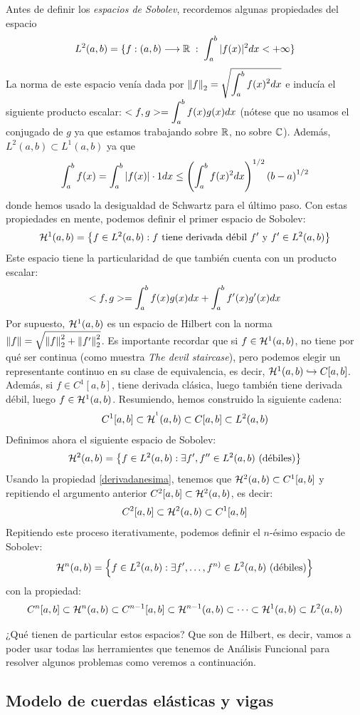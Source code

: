 Antes de definir los \textit{espacios de Sobolev}, recordemos algunas propiedades del espacio 
\[L^2(a,b)=\displaystyle\{f : (a,b) \longrightarrow \mathbb{R}\;:\; \displaystyle\int_{ a }^{ b } |f(x)|^2dx<+\infty\displaystyle\}\]
La norma de este espacio venía dada por $\left\lVert f\right\rVert_2=\sqrt{\displaystyle\int_{ a }^{ b } f(x)^2dx}$ e inducía el siguiente producto escalar: $<f,g>=\displaystyle\int_{ a }^{ b } f(x)g(x)dx$ (nótese que no usamos el conjugado de $g$ ya que estamos trabajando sobre $\mathbb{R}$, no sobre $\mathbb{C}$). Además, $L^2(a,b)\subset L^1(a,b)$ ya que 
\[
\displaystyle\int_{ a }^{ b } f(x)=\displaystyle\int_{ a }^{ b } |f(x)|\cdot 1dx\leq \left(\displaystyle\int_{ a }^{ b } f(x)^2dx\right)^{1/2}\left(b-a\right)^{1/2}
\]
donde hemos usado la desigualdad de Schwartz para el último paso. Con estas propiedades en mente, podemos definir el primer espacio de Sobolev:
\[
\mathcal{H}^{ 1 }(a,b)=\left\{ f\in L^{ 2 }(a,b): f \text{ tiene derivada débil }f' \text{ y } f'\in L^{ 2 }(a,b) \right\}
\]
Este espacio tiene la particularidad de que también cuenta con un producto escalar:
\[
<f,g>=\displaystyle\int_{ a }^{ b } f(x)g(x)dx+\displaystyle\int_{ a }^{ b } f'(x)g'(x)dx
\]
Por supuesto, $\mathcal{H}^{ 1 }(a,b)$ es un espacio de Hilbert con la norma $\left\lVert f\right\rVert=\sqrt{\left\lVert f\right\rVert^2_2+\left\lVert f'\right\rVert_2^2}$. Es importante recordar que si $f\in\mathcal{H}^{ 1 }(a,b)$, no tiene por qué ser continua (como muestra \textit{The devil staircase}), pero podemos elegir un representante continuo en su clase de equivalencia, es decir, $\mathcal{H}^{ 1 }(a,b)\hookrightarrow C[a,b]$. Además, si $f\in C^1[a,b]$, tiene derivada clásica, luego también tiene derivada débil, luego $f\in\mathcal{H}^{ 1 }(a,b)$. Resumiendo, hemos construido la siguiente cadena:
\[
C^1[a,b]\subset\mathcal{H}^{ ^1 }(a,b)\subset C[a,b]\subset L^{ 2 }(a,b)
\]
Definimos ahora el siguiente espacio de Sobolev:
\[
\mathcal{H}^{ 2 }(a,b)=\left\{ f\in L^{ 2 }(a,b): \exists f',f''\in L^{ 2 }(a,b)\text{ (débiles)} \right\}
\]
Usando la propiedad \ref{derivadanesima}, tenemos que $\mathcal{H}^{ 2 }(a,b)\subset C^1[a,b]$ y repitiendo el argumento anterior $C^2[a,b]\subset \mathcal{H}^{ 2 }(a,b)$, es decir:
\[
C^2[a,b]\subset \mathcal{H}^{ 2 }(a,b)\subset C^1[a,b]
\]
Repitiendo este proceso iterativamente, podemos definir el $n$-ésimo espacio de Sobolev:
\[
\mathcal{H}^{ n }(a,b)=\left\{ f\in L^{ 2 }(a,b): \exists f',\dots,f^{n)}\in L^{ 2 }(a,b) \text{ (débiles)} \right\}
\]
con la propiedad:
\[
C^{n}[a,b]\subset\mathcal{H}^{ n }(a,b)\subset C^{n-1}[a,b]\subset\mathcal{H}^{ n-1 }(a,b)\subset\dots\subset\mathcal{H}^{ 1 }(a,b)\subset L^{ 2 }(a,b)
\]

¿Qué tienen de particular estos espacios? Que son de Hilbert, es decir, vamos a poder usar todas las herramientes que tenemos de Análisis Funcional para resolver algunos problemas como veremos a continuación.

\subsection{Modelo de cuerdas elásticas y vigas}
